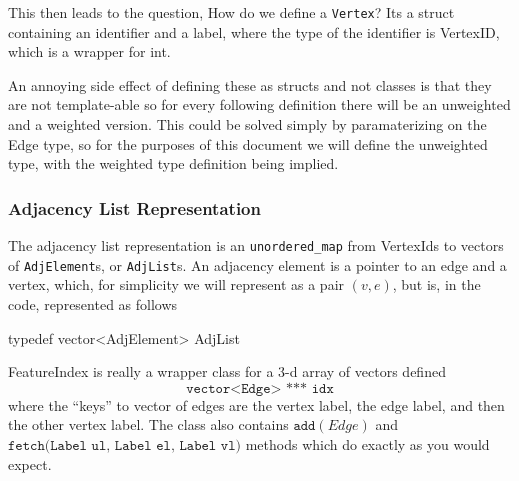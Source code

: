\begin{algorithm}[H]
  \label{struct:edge}
\end{algorithm}

This then leads to the question, How do we define a \texttt{Vertex}? Its a
struct containing an  identifier and a label, where the type of the identifier
is VertexID, which is a wrapper for int.

\begin{algorithm}[H]
  \label{struct:vertex}
\end{algorithm}

An annoying side effect of defining these as structs and not classes is that
they are not template-able so for every following definition there will be an
unweighted and a weighted version. This could be solved simply by paramaterizing
on the Edge type, so for the purposes of this document we will define the
unweighted type, with the weighted type definition being implied.

\subsubsection{Adjacency List Representation}

The adjacency list representation is an \texttt{unordered\_map} from VertexIds
to vectors of \texttt{AdjElement}s, or \texttt{AdjList}s.  An adjacency element
is a pointer to an edge and a vertex, which, for simplicity we will represent as
a pair $(v,e)$, but is, in the code, represented as follows

\begin{algorithm}[H]

  typedef vector<AdjElement> AdjList\;

\end{algorithm}

FeatureIndex is really a wrapper class for a 3-d array of vectors defined
\[\texttt{vector<Edge> *** idx}\]
where the ``keys'' to vector of edges are the vertex label, the edge label, and
then the other vertex label. The class also contains $\texttt{add}(Edge)$ and
$\texttt{fetch(Label ul, Label el, Label vl)}$ methods which do exactly as you would
expect.

